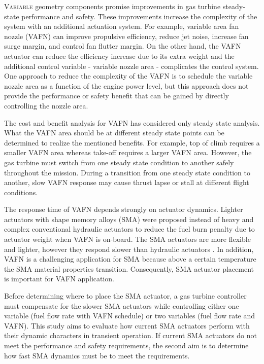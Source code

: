 
\lettrine[nindent=0pt]{V}{ariable} geometry components promise improvements
in gas turbine steady-state performance and safety. These improvements 
increase the complexity of the system with an additional actuation system. For
example, variable area fan nozzle (VAFN) can improve propulsive efficiency, reduce jet noise, increase fan 
surge margin, and control fan flutter margin. On the other hand, the VAFN 
actuator can reduce the efficiency increase due to its extra weight and 
the additional control variable - variable nozzle area - complicates the control 
system. One approach to reduce the complexity of the VAFN is to schedule the 
variable nozzle area as a function of the engine power level, but this approach does not provide the performance or 
safety benefit that can be gained by directly controlling the nozzle area.

The cost and benefit analysis for VAFN has considered only steady state analysis. What the VAFN area should be at different steady state points can be 
determined to realize the mentioned benefits. For example, top of climb requires 
a smaller VAFN area whereas take-off requires a larger VAFN area. However, the
gas turbine must switch from one steady state condition to another safely 
throughout the mission. During a transition from one steady state condition to 
another, slow VAFN response may cause thrust lapse or stall at different flight 
conditions.

The response time of VAFN depends strongly on actuator dynamics. Lighter 
actuators with shape memory alloys (SMA) \cite{Mabe:2008,Mabe:2008:Paris} 
were proposed instead of heavy and complex conventional hydraulic actuators to
reduce the fuel burn penalty due to actuator weight when VAFN is on-board. 
The SMA actuators are more flexible and lighter, however they respond slower 
than hydraulic actuators \cite{Rey:2001,Barooah:2002,Song:2007}. In addition, 
VAFN is a challenging application for SMA because above a certain temperature the
SMA material properties transition. Consequently, SMA actuator placement is 
important for VAFN application.

Before determining where to place the SMA actuator, a gas turbine controller 
must compensate for the slower SMA actuators while controlling either one 
variable (fuel flow rate with VAFN schedule) or two variables (fuel flow rate and 
VAFN). This study aims to evaluate how current SMA actuators perform with 
their dynamic characters in transient operation. If current SMA actuators do not 
meet the performance and safety requirements, the second aim is to determine 
how fast SMA dynamics must be to meet the requirements.

